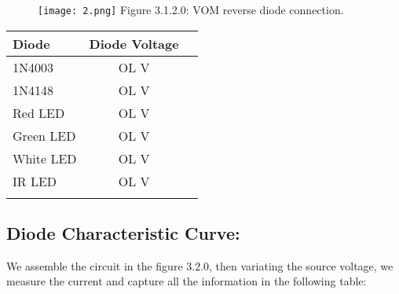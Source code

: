 \documentclass[10pt,a4paper]{article}
\begin{document}
\begin{multicols}{2}

\begin{figure}[H]
\texttt{[image: 2.png]}
\centering \linebreak \linebreak Figure 3.1.2.0: VOM reverse diode connection.
\end{figure}

\begin{center}
\begin{tabular}[.5cm]{l c c }
\toprule
Diode & Diode Voltage \\
\midrule
1N4003 & OL V \\
\cmidrule{1-2}
1N4148 & OL V \\
\cmidrule{1-2}
Red LED & OL V \\
\cmidrule{1-2}
Green LED & OL V \\
\cmidrule{1-2}
White LED & OL V \\
\cmidrule{1-2}
IR LED & OL V \\
\bottomrule
\linebreak
\end{tabular}
\end{center} 

\end{multicols}

\pagebreak

\subsection{Diode Characteristic Curve:}

We assemble the circuit in the figure 3.2.0, then variating the source voltage, we measure the current and capture all the information in the following table:
\end{document}
